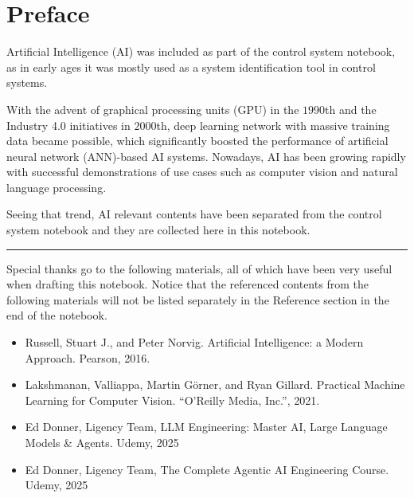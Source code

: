 \chapter*{Preface}

Artificial Intelligence (AI) was included as part of the control system notebook, as in early ages it was mostly used as a system identification tool in control systems.

With the advent of graphical processing units (GPU) in the $1990$th and the Industry 4.0 initiatives in $2000$th, deep learning network with massive training data became possible, which significantly boosted the performance of artificial neural network (ANN)-based AI systems. Nowadays, AI has been growing rapidly with successful demonstrations of use cases such as computer vision and natural language processing.

Seeing that trend, AI relevant contents have been separated from the control system notebook and they are collected here in this notebook. 

\vspace{0.1in}
\noindent \rule{1in}{0.4pt}
\vspace{0.1in}

Special thanks go to the following materials, all of which have been very useful when drafting this notebook. Notice that the referenced contents from the following materials will not be listed separately in the Reference section in the end of the notebook.
\begin{itemize}
  \item Russell, Stuart J., and Peter Norvig. Artificial Intelligence: a Modern Approach. Pearson, 2016.
  \item Lakshmanan, Valliappa, Martin G\"orner, and Ryan Gillard. Practical Machine Learning for Computer Vision. ``O'Reilly Media, Inc.'', 2021. 
  \item Ed Donner, Ligency Team, LLM Engineering: Master AI, Large Language Models \& Agents. Udemy, 2025
  \item Ed Donner, Ligency Team, The Complete Agentic AI Engineering Course. Udemy, 2025
\end{itemize} 